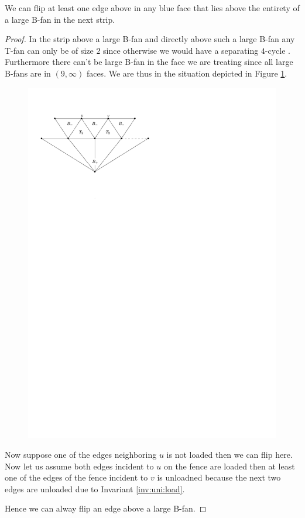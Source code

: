 \begin{lemma}
  \label{lm:uni:flipAboveLargeB-fan}
  We can flip at least one edge above in any blue face that lies above the entirety of a large B-fan in the next strip.
\end{lemma}
\begin{proof}
  In the strip above a large B-fan and directly above such a large B-fan any T-fan can only be of size $2$ since otherwise we would have a separating $4$-cycle . Furthermore there can't be large B-fan in the face we are treating since all large B-fans are in $(9,\infty)$ faces.  We are thus in the situation depicted in Figure \ref{fig:uni:flipAboveLargeB-fan}.

  \begin{figure}[h]
    \centering
    \includegraphics[scale=1]{unifiedAlgo/img/flipAboveLargeBfan}
    \caption{}
    \label{fig:uni:flipAboveLargeB-fan}
  \end{figure}

  Now suppose one of the edges neighboring $u$ is not loaded then we can flip here. Now let us assume both edges incident to $u$ on the fence are loaded then at least one of the edges of the fence incident to $v$ is unloadned  because the next two edges are unloaded due to Invariant \ref{inv:uni:load}.

  Hence we can alway flip an edge above a large B-fan.
\end{proof}


